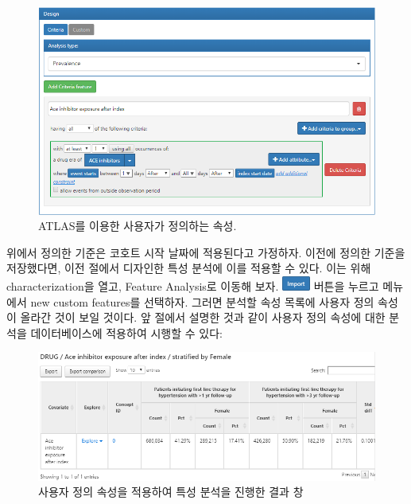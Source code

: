 \documentclass[10.5pt]{book}
\theoremstyle{definition}
\theoremstyle{definition}
\theoremstyle{definition}
\theoremstyle{remark}
\begin{document}
\begin{figure}

{\centering \includegraphics[width=1\linewidth]{images/Characterization/atlasCharacterizationCustomFeature} 

}

\caption{ATLAS를 이용한 사용자가 정의하는 속성.}\label{fig:atlasCharacterizationCustomFeature}
\end{figure}

위에서 정의한 기준은 코호트 시작 날짜에 적용된다고 가정하자. 이전에
정의한 기준을 저장했다면, 이전 절에서 디자인한 특성 분석에 이를 적용할
수 있다. 이는 위해 characterization을 열고, Feature Analysis로 이동해
보자. \includegraphics{images/Characterization/atlasImportButton.png}
버튼을 누르고 메뉴에서 new custom features를 선택하자. 그러면 분석할
속성 목록에 사용자 정의 속성이 올라간 것이 보일 것이다. 앞 절에서 설명한
것과 같이 사용자 정의 속성에 대한 분석을 데이터베이스에 적용하여 시행할
수 있다:

\begin{figure}

{\centering \includegraphics[width=1\linewidth]{images/Characterization/atlasCharacterizationCustomFeatureResults} 

}

\caption{사용자 정의 속성을 적용하여 특성 분석을 진행한 결과 창}\label{fig:atlasCharacterizationCustomFeatureResults}
\end{figure}
\end{document}
